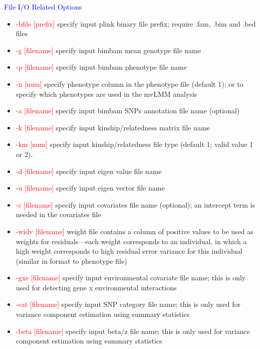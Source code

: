 \documentclass[11pt]{article}
\begin{document}
\textcolor{blue}{File I/O Related Options}
%
\begin{itemize}
\item \textcolor{red}{-bfile    [prefix]}          \quad specify input plink binary file prefix; require .fam, .bim and .bed files
\item \textcolor{red}{-g        [filename]}      \quad specify input bimbam mean genotype file name
\item  \textcolor{red}{-p        [filename]}      \quad specify input bimbam phenotype file name
\item  \textcolor{red}{-n        [num]}      \quad specify phenotype column in the phenotype file (default 1); or to specify which phenotypes are used in the mvLMM analysis
\item  \textcolor{red}{-a        [filename]}      \quad specify input bimbam SNPs annotation file name (optional)
\item  \textcolor{red}{ -k        [filename]}     \quad  specify input kinship/relatedness matrix file name
\item  \textcolor{red}{ -km       [num]}     \quad           specify input kinship/relatedness file type (default 1; valid value 1 or 2).
\item  \textcolor{red}{ -d        [filename]}     \quad  specify input eigen value file name
\item  \textcolor{red}{ -u        [filename]}     \quad  specify input eigen vector file name
\item  \textcolor{red}{ -c        [filename] }     \quad      specify input covariates file name (optional); an intercept term is needed in the covariates file
\item  \textcolor{red}{ -widv        [filename] }     \quad      weight file contains a column of positive values to be used as weights for residuals---each weight corresponds to an individual, in which a high weight corresponds to high residual error variance for this individual (similar in format to phenotype file)
\item  \textcolor{red}{ -gxe        [filename] }     \quad      specify input environmental covariate file name; this is only used for detecting gene x environmental interactions
\item  \textcolor{red}{ -cat        [filename] }     \quad      specify input SNP category file name; this is only used for variance component estimation using summary statistics
\item  \textcolor{red}{ -beta        [filename] }     \quad      specify input beta/z file name; this is only used for variance component estimation using summary statistics

\end{itemize}
\end{document}
